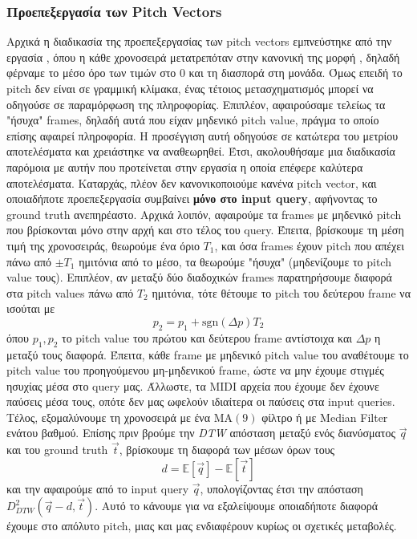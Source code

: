 \subsubsection{Προεπεξεργασία των Pitch Vectors}
Αρχικά η διαδικασία της προεπεξεργασίας των pitch vectors εμπνεύστηκε από την εργασία \cite{Zhu:2003:WIE:872757.872780}, όπου η κάθε χρονοσειρά μετατρεπόταν
στην κανονική της μορφή \cite{goldin1995similarity}, δηλαδή φέρναμε το μέσο όρο των τιμών στο 0 και τη διασπορά στη μονάδα. Όμως επειδή το
pitch δεν είναι σε γραμμική κλίμακα, ένας τέτοιος μετασχηματισμός μπορεί να οδηγούσε σε παραμόρφωση της πληροφορίας. Επιπλέον, αφαιρούσαμε
τελείως τα "ήσυχα" frames, δηλαδή αυτά που είχαν μηδενικό pitch value, πράγμα το οποίο επίσης αφαιρεί πληροφορία. Η προσέγγιση αυτή
οδηγούσε σε κατώτερα του μετρίου αποτελέσματα και χρειάστηκε να αναθεωρηθεί. Έτσι, ακολουθήσαμε μια διαδικασία παρόμοια με αυτήν που
προτείνεται στην εργασία \cite{stasiak2014follow} η οποία επέφερε καλύτερα αποτελέσματα. Καταρχάς, πλέον δεν κανονικοποιούμε κανένα pitch vector,
και οποιαδήποτε προεπεξεργασία συμβαίνει \textbf{μόνο στο input query}, αφήνοντας το ground truth ανεπηρέαστο. Αρχικά λοιπόν, αφαιρούμε τα frames
με μηδενικό pitch που βρίσκονται μόνο στην αρχή και στο τέλος του query. Έπειτα, βρίσκουμε τη μέση τιμή της χρονοσειράς, θεωρούμε ένα όριο
$T_1$, και όσα frames έχουν pitch που απέχει πάνω από $\pm T_1$ ημιτόνια από το μέσο, τα θεωρούμε "ήσυχα" (μηδενίζουμε το pitch value
τους). Επιπλέον, αν μεταξύ δύο διαδοχικών frames παρατηρήσουμε διαφορά στα pitch values πάνω από $T_2$ ημιτόνια, τότε θέτουμε το pitch του
δεύτερου frame να ισούται με
$$p_2 = p_1 + \mathrm{sgn}(\Delta p) T_2$$
όπου $p_1, p_2$ το pitch value του πρώτου και δεύτερου frame αντίστοιχα και $\Delta p$ η μεταξύ τους διαφορά. Έπειτα, κάθε frame με
μηδενικό pitch value του αναθέτουμε το pitch value του προηγούμενου μη-μηδενικού frame, ώστε να μην έχουμε στιγμές ησυχίας μέσα στο query
μας. Άλλωστε, τα MIDI αρχεία που έχουμε δεν έχουνε παύσεις μέσα τους, οπότε δεν μας ωφελούν ιδιαίτερα οι παύσεις στα input queries.
Τέλος, εξομαλύνουμε τη χρονοσειρά με ένα $\mathrm{MA}(9)$ φίλτρο ή με Median Filter ενάτου βαθμού. Επίσης πριν βρούμε την \emph{DTW} απόσταση μεταξύ ενός διανύσματος
$\vec{q}$ και του ground truth $\vec{t}$, βρίσκουμε τη διαφορά των μέσων όρων τους
$$d = \mathbb{E}[\vec{q}] - \mathbb{E}[\vec{t}]$$
και την αφαιρούμε από το input query $\vec{q}$, υπολογίζοντας έτσι την απόσταση $D^2_{DTW}(\vec{q} - d, \vec{t})$. Αυτό το
κάνουμε για να εξαλείψουμε οποιαδήποτε διαφορά έχουμε στο απόλυτο pitch, μιας και μας ενδιαφέρουν κυρίως οι σχετικές μεταβολές.

